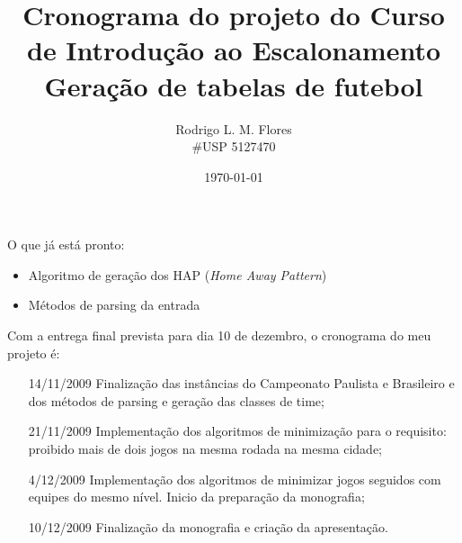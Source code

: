 \documentclass[a4paper,12pt,notitlepage]{article}
\title{Cronograma do projeto do Curso de Introdução ao Escalonamento \\ Geração de tabelas de futebol}
\author{Rodrigo L. M. Flores \\ \#USP 5127470}
\date{\today}
\begin{document}
\maketitle

O que já está pronto:

\begin{itemize}
  \item Algoritmo de geração dos HAP (\textit{Home Away Pattern})
  \item Métodos de parsing da entrada
\end{itemize}

Com a entrega final prevista para dia 10 de dezembro, o cronograma do meu projeto é:

\begin{itemize}
  
  \item[14/11/2009] Finalização das instâncias do Campeonato Paulista e Brasileiro e 
dos métodos de parsing e geração das classes de time;
  \item[21/11/2009] Implementação dos algoritmos de minimização para o requisito: 
proibido mais de dois jogos na mesma rodada na mesma cidade;
  \item[4/12/2009] Implementação dos algoritmos de minimizar jogos seguidos com equipes
do mesmo nível. Inicio da preparação da monografia;
  \item[10/12/2009] Finalização da monografia e criação da apresentação.
\end{itemize}
\end{document}
